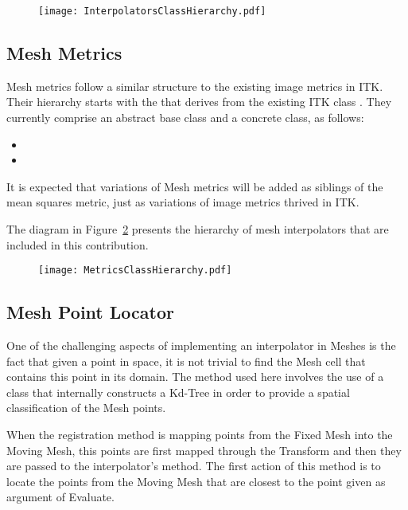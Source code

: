 \documentclass{InsightArticle}
\begin{document}
\begin{figure}
\center
\texttt{[image: InterpolatorsClassHierarchy.pdf]}
\label{fig:InterpolatorsClassHierarchy}
\end{figure}

\subsection{Mesh Metrics}

Mesh metrics follow a similar structure to the existing image metrics in ITK.
Their hierarchy starts with the  that derives from
the existing ITK class . They currently comprise
an abstract base class and a concrete class, as follows:

\begin{itemize}
\item {}
\item {}
\end{itemize}

It is expected that variations of Mesh metrics will be added as siblings of the
mean squares metric, just as variations of image metrics thrived in ITK.

The diagram in Figure~\ref{fig:MetricsClassHierarchy} presents the hierarchy of mesh
interpolators that are included in this contribution.

\begin{figure}
\center
\texttt{[image: MetricsClassHierarchy.pdf]}
\label{fig:MetricsClassHierarchy}
\end{figure}

\subsection{Mesh Point Locator}

One of the challenging aspects of implementing an interpolator in Meshes is the
fact that given a point in space, it is not trivial to find the Mesh cell that
contains this point in its domain. The method used here involves the use of a
 class that internally constructs a Kd-Tree in order to provide
a spatial classification of the Mesh points.

When the registration method is mapping points from the Fixed Mesh into the
Moving Mesh, this points are first mapped through the Transform and then they
are passed to the interpolator's  method. The first action of
this method is to locate the points from the Moving Mesh that are closest to
the point given as argument of Evaluate.
\end{document}
